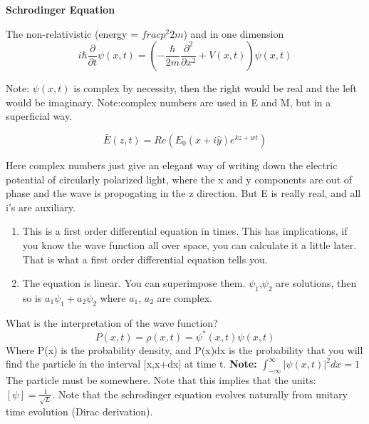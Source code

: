 \documentclass{article}
\begin{document}
\setlength{\parindent}{0pt}

\textbf{Schrodinger Equation}
\vspace{5mm}

The non-relativistic (energy = $frac{p^2}{2m}$) and in one dimension 
\begin{equation}
i\hbar \frac{\partial}{\partial t}\psi (x,t) = (-\frac{\hbar}{2m}\frac{\partial^2}{\partial x^2} +V(x,t))\psi (x,t)
\end{equation}

Note: $\psi(x,t)$ is complex by necessity, then the right would be real and the left would be imaginary. 
\vspace{5mm}
Note:complex numbers are used in E and M, but in a superficial way.

\begin{equation}
\bar{E}(z,t)=Re(E_0(\hat{x}+i\hat{y})e^{kz+wt})
\end{equation}

Here complex numbers just give an elegant way of writing down the electric potential of circularly polarized light, where the x and y components are out of phase and the wave is propogating in the z direction. But E is really real, and all i's are auxiliary. 

\vspace{5mm}
\begin{enumerate}
\item This is a first order differential equation in times. This has implications, if you know the wave function all over space, you can calculate it a little later. That is what a first order differential equation tells you. 
\item The equation is linear. You can superimpose them. $\psi_1$,$\psi_2$ are solutions, then so is $a_1\psi_1+a_2\psi_2$ where $a_1$, $a_2$ are complex. 
\end{enumerate}

What is the interpretation of the wave function?
\begin{equation}
P(x,t)=\rho(x,t)=\psi^*(x,t)\psi(x,t)
\end{equation}
Where P(x) is the probability density, and P(x)dx is the probability that you will find the particle in the interval [x,x+dx] at time t. 
\vspace{5mm}
\textbf{Note:} $\int_{-\infty}^{\infty}\vert \psi(x,t)\vert^2dx=1$ The particle must be somewhere. Note that this implies that the units: $[\psi]=\frac{1}{\sqrt{L}}$. Note that the schrodinger equation evolves naturally from unitary time evolution (Dirac derivation). 
\end{document}
